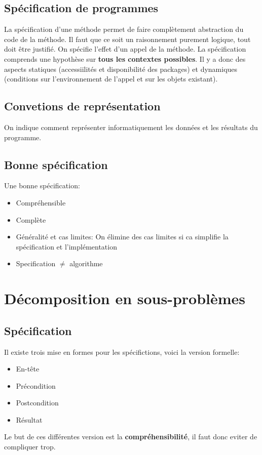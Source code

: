 \documentclass[11pt, a4paper]{article}
\begin{document}
\subsection{Spécification de programmes}

La spécification d'une méthode permet de faire complètement abstraction du code de la méthode. Il faut que ce soit un raisonnement purement logique, tout doit être justifié. On spécifie l'effet d'un appel de la méthode. La spécification comprends une hypothèse sur \textbf{tous les contextes possibles}. Il y a donc des aspects statiques (accessiilités et disponibilité des packages) et dynamiques (conditions sur l'environnement de l'appel et sur les objets existant). 

\subsection{Convetions de représentation}

On indique comment représenter informatiquement les données et les résultats du programme. 

\subsection{Bonne spécification}

Une bonne spécification:
\begin{itemize}
\item Compréhensible
\item Complète
\item Généralité et cas limites: On élimine des cas limites si ca simplifie la spécification et l'implémentation
\item Specification $\neq$ algorithme
\end{itemize}

\section{Décomposition en sous-problèmes}

\subsection{Spécification}

Il existe trois mise en formes pour les spécifictions, voici la version formelle:
\begin{itemize}
\item En-tête
\item Précondition
\item Postcondition
\item Résultat
\end{itemize}
Le but de ces différentes version est la \textbf{compréhensibilité}, il faut donc eviter de compliquer trop.
\end{document}
